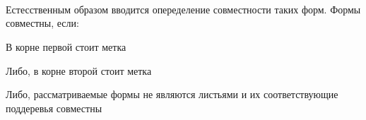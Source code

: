 \begin{code}%
\>  \AgdaSymbol{:}  \<%
\\
\>[0]\<[2]%
\>[2] \AgdaSymbol{:} \<%
\\
\>[0]\<[2]%
\>[2] \AgdaSymbol{:} \<%
\\
\>[0]\<[2]%
\>[2] \AgdaSymbol{:} \AgdaSymbol{(}  \AgdaSymbol{:} \AgdaSymbol{)}  \<%
\end{code}

Естесственным образом вводится опеределение совместности таких форм.
Формы совместны, если:

\begin{code}%
\>  \AgdaSymbol{:}      \<%
\end{code}

В корне первой стоит метка 

\begin{code}%
\>[0]\<[2]%
\>[2] \AgdaSymbol{:} \AgdaSymbol{(} \AgdaSymbol{:} \AgdaSymbol{)}    \<%
\end{code}

Либо, в корне второй стоит метка 

\begin{code}%
\>[0]\<[2]%
\>[2] \AgdaSymbol{:} \AgdaSymbol{(} \AgdaSymbol{:} \AgdaSymbol{)}    \<%
\end{code}

Либо, рассматриваемые формы не являются листьями и их соответствующие
поддеревья совместны

\begin{code}%
\>[0]\<[2]%
\>[2] \AgdaSymbol{:}  \AgdaSymbol{\{}    \AgdaSymbol{:} \AgdaSymbol{\}}         \<[56]%
\>[56]\<%
\\
\>[2]\<[4]%
\>[4]       \<%
\end{code}
    
